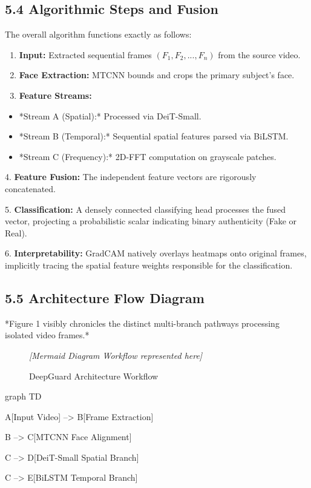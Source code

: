 \documentclass[12pt,a4paper]{article}
\begin{document}
\subsection{5.4 Algorithmic Steps and Fusion}
The overall algorithm functions exactly as follows:

\begin{enumerate}
\item \textbf{Input:} Extracted sequential frames $(F_1, F_2, ..., F_n)$ from the source video.
\item \textbf{Face Extraction:} MTCNN bounds and crops the primary subject's face.
\item \textbf{Feature Streams:}
\end{enumerate}
\begin{itemize}
\item *Stream A (Spatial):* Processed via DeiT-Small.
\item *Stream B (Temporal):* Sequential spatial features parsed via BiLSTM.
\item *Stream C (Frequency):* 2D-FFT computation on grayscale patches.
\end{itemize}
4. \textbf{Feature Fusion:} The independent feature vectors are rigorously concatenated.

5. \textbf{Classification:} A densely connected classifying head processes the fused vector, projecting a probabilistic scalar indicating binary authenticity (Fake or Real).

6. \textbf{Interpretability:} GradCAM natively overlays heatmaps onto original frames, implicitly tracing the spatial feature weights responsible for the classification.

\subsection{5.5 Architecture Flow Diagram}
*Figure 1 visibly chronicles the distinct multi-branch pathways processing isolated video frames.*

\begin{figure}[h!]
\centering
\textit{[Mermaid Diagram Workflow represented here]}
\caption{DeepGuard Architecture Workflow}
\end{figure}
graph TD

A[Input Video] --> B[Frame Extraction]

B --> C[MTCNN Face Alignment]

C --> D[DeiT-Small Spatial Branch]

C --> E[BiLSTM Temporal Branch]
\end{document}
